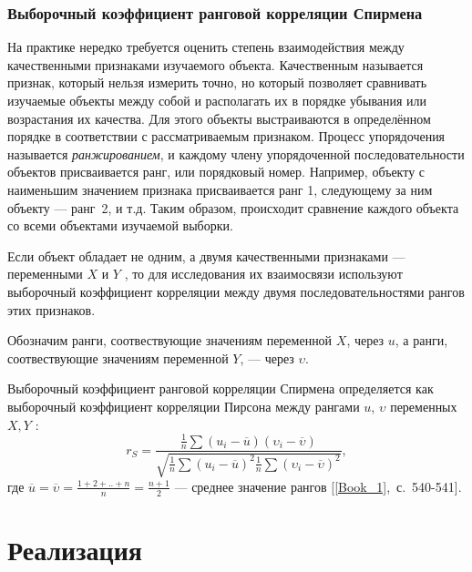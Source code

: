 \documentclass[12pt,a4paper]{article}
\begin{document}
	\subsubsection{Выборочный коэффициент ранговой корреляции Спирмена}
	На практике нередко требуется оценить степень взаимодействия между качественными признаками изучаемого объекта. Качественным называется признак, который нельзя измерить точно, но который позволяет сравнивать изучаемые объекты между собой и располагать их в порядке убывания или возрастания их качества. Для этого объекты выстраиваются в определённом порядке в соответствии с рассматриваемым признаком. Процесс упорядочения называется \emph{ранжированием}, и каждому члену упорядоченной последовательности объектов присваивается ранг, или порядковый номер. Например, объекту с наименьшим значением признака присваивается ранг 1, следующему за ним объекту --- ранг~2, и т.д. Таким образом, происходит сравнение каждого объекта со всеми объектами изучаемой выборки.
	
	Если объект обладает не одним, а двумя качественными признаками --- переменными $X$ и $Y$ , то для исследования их взаимосвязи используют выборочный коэффициент корреляции между двумя последовательностями рангов этих признаков.
	
	Обозначим ранги, соотвествующие значениям переменной $X$, через $u$, а ранги, соотвествующие значениям переменной $Y$, --- через $\upsilon$.
	
	Выборочный коэффициент ранговой корреляции Спирмена определяется как выборочный коэффициент корреляции Пирсона между рангами $u$, $\upsilon$ переменных $X, Y$ :
	\begin{equation}\label{eqn:sperman}
	r_S = \frac{\frac{1}{n} \sum(u_i - \overline{u})(\upsilon_i - \overline{\upsilon})}{\sqrt{\frac{1}{n} \sum (u_i - \overline{u})^2 \frac{1}{n} \sum(\upsilon_i - \overline{\upsilon})^2}},
	\end{equation}
	где $\overline{u} = \overline{\upsilon} = \frac{1 + 2 + .. + n}{n} = \frac{n + 1}{2}$ --- среднее значение рангов [\ref{Book_1},~с.~540-541].
	
	\newpage
	\section{Реализация}	
\end{document}
